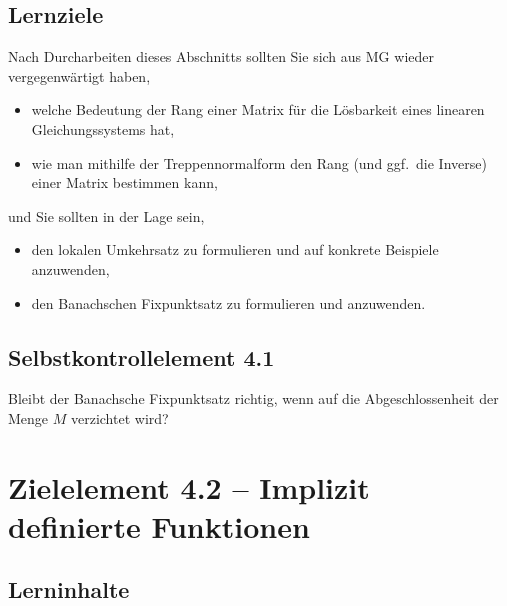 \documentclass[a4paper,12pt]{article}
\begin{document}
\subsection*{Lernziele}

Nach Durcharbeiten dieses Abschnitts sollten Sie sich aus MG wieder vergegenwärtigt haben,
\begin{itemize}
  \item welche Bedeutung der Rang einer Matrix für die Lösbarkeit eines linearen
        Gleichungssystems hat,
  \item wie man mithilfe der Treppennormalform den Rang (und ggf.\ die Inverse)
        einer Matrix bestimmen kann,
\end{itemize}
und Sie sollten in der Lage sein,
\begin{itemize}
  \item den lokalen Umkehrsatz zu formulieren und auf konkrete Beispiele anzuwenden,
  \item den Banachschen Fixpunktsatz zu formulieren und anzuwenden.
\end{itemize}

\subsection*{Selbstkontrollelement 4.1}

Bleibt der Banachsche Fixpunktsatz richtig, wenn auf die Abgeschlossenheit der
Menge $M$ verzichtet wird?

\newpage

\section*{Zielelement 4.2 -- Implizit definierte Funktionen}

\subsection*{Lerninhalte}

\begin{center}
\end{center}
\end{document}
